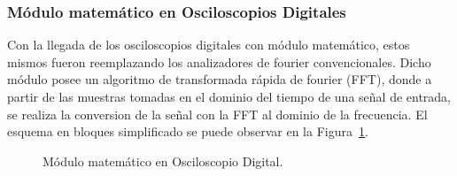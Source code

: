 \subsubsection{Módulo matemático en Osciloscopios Digitales}

    Con la llegada de los osciloscopios digitales con módulo matemático, estos mismos 
    fueron reemplazando los analizadores de fourier convencionales.
    Dicho módulo posee un algoritmo de transformada rápida de fourier (FFT), donde 
    a partir de las muestras tomadas en el dominio del tiempo de una señal de entrada,
    se realiza la conversion de la señal con la FFT al dominio de la frecuencia.
    El esquema en bloques simplificado se puede observar en la Figura~\ref{fig:MathModuleEnOscil}.
        \begin{figure}[H]
            \centering
            \caption{Módulo matemático en Osciloscopio Digital.}
            \label{fig:MathModuleEnOscil}
        \end{figure}
    
